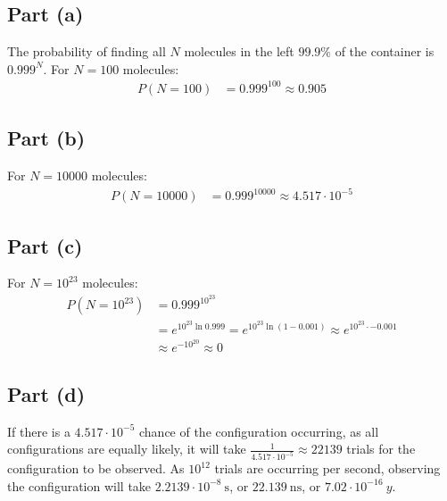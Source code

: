 \documentclass{article}
\begin{document}
\clearpage

\subsection*{Part (a)}
The probability of finding all $N$ molecules in the left $99.9\%$ of the container is $0.999^N$. For $N = 100$ molecules:
\begin{equation}
    \begin{split}
        P\left(N = 100\right) & = 0.999^{100} \approx 0.905
    \end{split}
\end{equation}
\subsection*{Part (b)}
For $N = 10000$ molecules:
\begin{equation}
    \begin{split}
        P\left(N = 10000\right) & = 0.999^{10000} \approx 4.517 \cdot 10^{-5}
    \end{split}
\end{equation}
\subsection*{Part (c)}
For $N = 10^{23}$ molecules:
\begin{equation}
    \begin{split}
        P\left(N = 10^{23}\right) & = 0.999^{10^{23}} \\
        & = e^{10^{23}\ln 0.999} = e^{10^{23}\ln\left(1 - 0.001\right)} \approx e^{10^{23} \cdot -0.001} \\
        & \approx e^{-10^{20}} \approx 0
    \end{split}
\end{equation}
\subsection*{Part (d)}
If there is a $4.517 \cdot 10^{-5}$ chance of the configuration occurring, as all configurations are equally likely, it will take $\frac{1}{4.517 \cdot 10^{-5}} \approx 22139$ trials for the configuration to be observed. As $10^{12}$ trials are occurring per second, observing the configuration will take $2.2139 \cdot 10^{-8}~\unit{\second}$, or $22.139~\unit{\nano\second}$, or $7.02 \cdot 10^{-16}~\unit{y}$.
\end{document}
